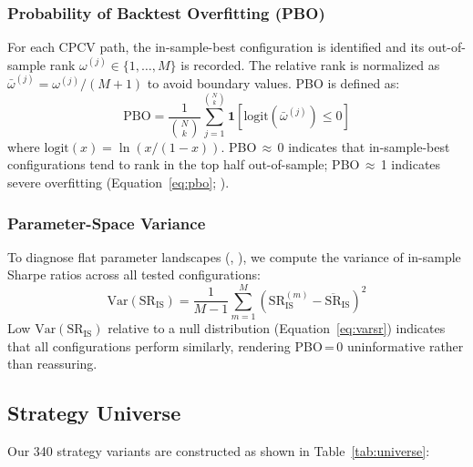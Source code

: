 \documentclass[preprint,12pt,authoryear]{elsarticle}
\begin{document}
\subsubsection{Probability of Backtest Overfitting (PBO)}
For each CPCV path, the in-sample-best configuration is identified and its out-of-sample rank $\omega^{(j)} \in \{1, \ldots, M\}$ is recorded. The relative rank is normalized as $\bar{\omega}^{(j)} = \omega^{(j)} / (M+1)$ to avoid boundary values. PBO is defined as:
\begin{equation}
\mathrm{PBO} = \frac{1}{\binom{N}{k}} \sum_{j=1}^{\binom{N}{k}} \mathbf{1}\!\left[\mathrm{logit}(\bar{\omega}^{(j)}) \leq 0\right]
\label{eq:pbo}
\end{equation}
where $\mathrm{logit}(x) = \ln(x / (1-x))$. PBO\,$\approx$\,0 indicates that in-sample-best configurations tend to rank in the top half out-of-sample; PBO\,$\approx$\,1 indicates severe overfitting (Equation~\ref{eq:pbo}; \citealt{bailey2017probability}).

\subsubsection{Parameter-Space Variance}
To diagnose flat parameter landscapes (\citeauthor{witzany2021bayesian}, \citeyear{witzany2021bayesian}), we compute the variance of in-sample Sharpe ratios across all tested configurations:
\begin{equation}
\mathrm{Var}(\mathrm{SR}_{\mathrm{IS}}) = \frac{1}{M-1}\sum_{m=1}^{M}\left(\mathrm{SR}_{\mathrm{IS}}^{(m)} - \overline{\mathrm{SR}}_{\mathrm{IS}}\right)^2
\label{eq:varsr}
\end{equation}
Low $\mathrm{Var}(\mathrm{SR}_{\mathrm{IS}})$ relative to a null distribution (Equation~\ref{eq:varsr}) indicates that all configurations perform similarly, rendering PBO\,=\,0 uninformative rather than reassuring.

\subsection{Strategy Universe}

Our 340 strategy variants are constructed as shown in Table~\ref{tab:universe}:
\end{document}
